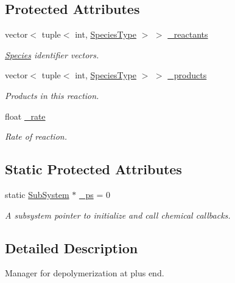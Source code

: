 \subsection*{Protected Attributes}
\begin{DoxyCompactItemize}
\item 
vector$<$ tuple$<$ int, \hyperlink{Species_8h_a50651af47c56ea0e27235468d23542cf}{Species\+Type} $>$ $>$ \hyperlink{classInternalFilamentRxnManager_a63de9061c3da4ad03cf4c530d2774979}{\+\_\+reactants}
\begin{DoxyCompactList}\small\item\em \hyperlink{classSpecies}{Species} identifier vectors. \end{DoxyCompactList}\item 
vector$<$ tuple$<$ int, \hyperlink{Species_8h_a50651af47c56ea0e27235468d23542cf}{Species\+Type} $>$ $>$ \hyperlink{classInternalFilamentRxnManager_afd213da1a3706e2e88962e5da886a5dc}{\+\_\+products}
\begin{DoxyCompactList}\small\item\em Products in this reaction. \end{DoxyCompactList}\item 
float \hyperlink{classInternalFilamentRxnManager_a8b98dd9e6f5d016149f5434b891806df}{\+\_\+rate}
\begin{DoxyCompactList}\small\item\em Rate of reaction. \end{DoxyCompactList}\end{DoxyCompactItemize}
\subsection*{Static Protected Attributes}
\begin{DoxyCompactItemize}
\item 
static \hyperlink{classSubSystem}{Sub\+System} $\ast$ \hyperlink{classInternalFilamentRxnManager_a973ce9cc2aae811e6867afa46193c5f2}{\+\_\+ps} = 0
\begin{DoxyCompactList}\small\item\em A subsystem pointer to initialize and call chemical callbacks. \end{DoxyCompactList}\end{DoxyCompactItemize}


\subsection{Detailed Description}
Manager for depolymerization at plus end. 

